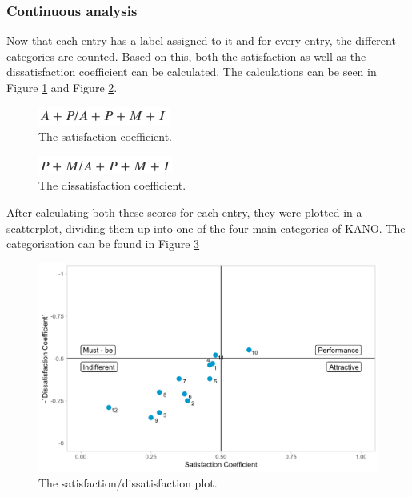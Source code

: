 \subsubsection{Continuous analysis}
Now that each entry has a label assigned to it and for every entry, the different categories are counted. Based on this, both the satisfaction as well as the dissatisfaction coefficient can be calculated. The calculations can be seen in Figure \ref{fig:satisfactionCoef} and Figure \ref{fig:dissatisfactionCoef}.
\begin{figure}[!htb]
	\centering
	\includegraphics{../LaTeX/Figures/Kano/SatisfactionCoef.png}
	\caption{The satisfaction coefficient.}
	\label{fig:satisfactionCoef}
\end{figure}
\begin{figure}[!htb]
	\centering
	\includegraphics{../LaTeX/Figures/Kano/DissatisfactionCoef.png}
	\caption{The dissatisfaction coefficient.}
	\label{fig:dissatisfactionCoef}
\end{figure}
\break
After calculating both these scores for each entry, they were plotted in  a scatterplot, dividing them up into one of the four main categories of KANO. The categorisation can be found in Figure \ref{fig:satisfactionPlot}
\begin{figure}[!htb]
	\centering
	\includegraphics[width=\linewidth]{../LaTeX/Figures/Kano/SatisfactionPlot.png}
	\caption{The satisfaction/dissatisfaction plot.}
	\label{fig:satisfactionPlot}
\end{figure}


